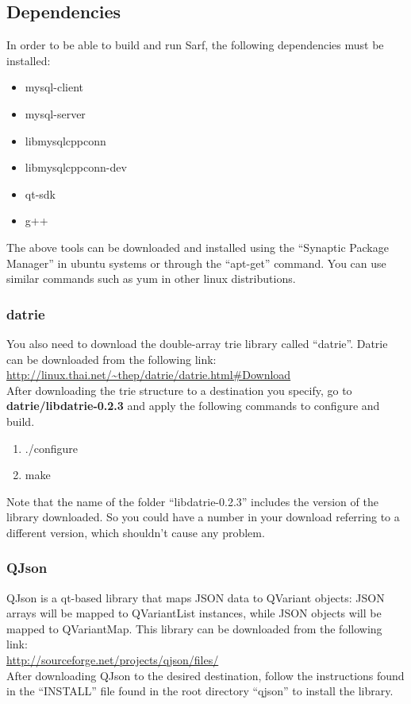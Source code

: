 \documentclass{article}
\begin{document}
\subsection{Dependencies}
In order to be able to build and run Sarf, the following dependencies must be installed:
\begin{itemize}
\item mysql-client
\item mysql-server
\item libmysqlcppconn
\item libmysqlcppconn-dev
\item qt-sdk
\item g++
\end{itemize}
The above tools can be downloaded and installed using the ``Synaptic Package Manager'' in ubuntu systems or through the ``apt-get'' command. You can use similar commands such as yum in other linux distributions.
\subsubsection{datrie}
You also need to download the double-array trie library called ``datrie''. Datrie can be downloaded from the following link:\\
\url{http://linux.thai.net/~thep/datrie/datrie.html#Download }\\
After downloading the trie structure to a destination you specify, go to {\bf datrie/libdatrie-0.2.3} and apply the following commands to configure and build.
\begin{enumerate}
\item ./configure
\item make
\end{enumerate}
Note that the name of the folder ``libdatrie-0.2.3'' includes the version of the library downloaded. So you could have a number in your download referring to a different version, which shouldn't cause any problem.

\subsubsection{QJson}
QJson is a qt-based library that maps JSON data to QVariant objects: JSON arrays will be mapped to QVariantList instances, while JSON objects will be mapped to QVariantMap. This library can be downloaded from the following link:\\
\url{http://sourceforge.net/projects/qjson/files/}\\
After downloading QJson to the desired destination, follow the instructions found in the ``INSTALL'' file found in the root directory ``qjson'' to install the library.
\end{document}
